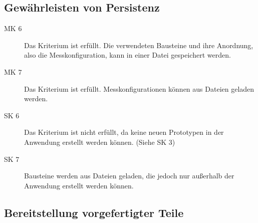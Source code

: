 \documentclass[parskip=full]{scrartcl}
\begin{document}
\subsection{Gewährleisten von Persistenz}

\begin{description}
\item[MK 6] Das Kriterium ist erfüllt. Die verwendeten Bausteine und ihre Anordnung, also die Messkonfiguration, kann in einer Datei gespeichert werden.
\item[MK 7] Das Kriterium ist erfüllt. Messkonfigurationen können aus Dateien geladen werden.
\item[SK 6] Das Kriterium ist nicht erfüllt, da keine neuen Prototypen in der Anwendung erstellt werden können. (Siehe SK 3)
\item[SK 7] Bausteine werden aus Dateien geladen, die jedoch nur außerhalb der Anwendung erstellt werden können.
\end{description}

\subsection {Bereitstellung vorgefertigter Teile}
\end{document}
